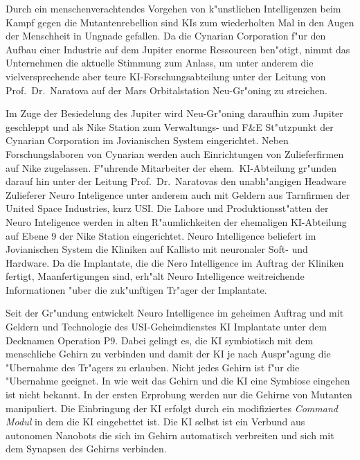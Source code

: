 

Durch ein menschenverachtendes Vorgehen von k"unstlichen Intelligenzen beim Kampf gegen die Mutantenrebellion sind KIs zum wiederholten Mal in den Augen der Menschheit in Ungnade gefallen. Da die Cynarian Corporation f"ur den Aufbau einer Industrie auf dem Jupiter enorme Ressourcen ben"otigt, nimmt das Unternehmen die aktuelle Stimmung zum Anlass, um unter anderem die vielversprechende aber teure KI-Forschungsabteilung unter der Leitung von Prof.~Dr.~Naratova auf der Mars Orbitalstation Neu-Gr"oning zu streichen.

Im Zuge der Besiedelung des Jupiter wird Neu-Gr"oning daraufhin zum Jupiter geschleppt und als Nike Station zum Verwaltungs- und F\&E St"utzpunkt der Cynarian Corporation im Jovianischen System eingerichtet. Neben Forschungslaboren von Cynarian werden auch Einrichtungen von Zulieferfirmen auf Nike zugelassen. F"uhrende Mitarbeiter der ehem.~KI-Abteilung gr"unden darauf hin unter der Leitung Prof.~Dr.~Naratovas den unabh"angigen Headware Zulieferer Neuro Inteligence unter anderem auch mit Geldern aus Tarnfirmen der United Space Industries, kurz USI. Die Labore und Produktionsst"atten der Neuro Inteligence werden in alten R"aumlichkeiten der ehemaligen KI-Abteilung auf Ebene 9 der Nike Station eingerichtet. Neuro Intelligence beliefert im Jovianischen System die Kliniken auf Kallisto mit neuronaler Soft- und Hardware. Da die Implantate, die die Nero Intelligence im Auftrag der Kliniken fertigt, Ma\3anfertigungen sind, erh"alt Neuro Intelligence weitreichende Informationen "uber die zuk"unftigen Tr"ager der Implantate.

Seit der Gr"undung entwickelt Neuro Intelligence im geheimen Auftrag und mit Geldern und Technologie des USI-Geheimdienstes KI Implantate unter dem Decknamen Operation P9. Dabei gelingt es, die KI symbiotisch mit dem menschliche Gehirn zu verbinden und damit der KI je nach Auspr"agung die "Ubernahme des Tr"agers zu erlauben. Nicht jedes Gehirn ist f"ur die "Ubernahme geeignet. In wie weit das Gehirn und die KI eine Symbiose eingehen ist nicht bekannt. In der ersten Erprobung werden nur die Gehirne von Mutanten manipuliert. Die Einbringung der KI erfolgt durch ein modifiziertes \emph{Command Modul} in dem die KI eingebettet ist. Die KI selbst ist ein Verbund aus autonomen Nanobots die sich im Gehirn automatisch verbreiten und sich mit dem Synapsen des Gehirns verbinden.

